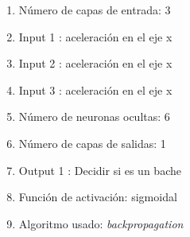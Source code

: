 \begin{itemize}
			\begin{enumerate}
				\item Número de capas de entrada: 3
				\item Input 1 : aceleración en el eje x
				\item Input 2 : aceleración en el eje x
				\item Input 3 : aceleración en el eje x
				\item Número de neuronas ocultas: 6
				\item Número de capas de salidas: 1
				\item Output 1 : Decidir si es un bache
				\item Función de activación: sigmoidal
				\item Algoritmo usado: \emph{backpropagation}
			\end{enumerate}
			
		\end{itemize}

